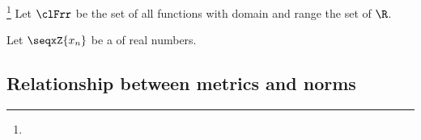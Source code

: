 \begin{example}
\footnote{
  }
\label{ex:ln_norm}
Let $\clFrr$ be the set of all functions with domain and range the set of  $\R$.
\end{example}

\begin{example}[$l_p$ norms]
\label{ex:norms}
Let $\seqxZ{x_n}$ be a  %
of real numbers.
\end{example}


\subsection{Relationship between metrics and norms}

